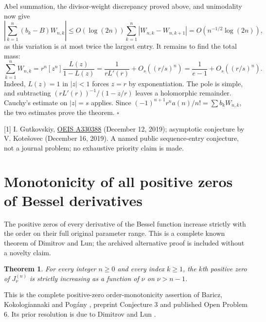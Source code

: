 \documentclass[11pt,a4paper]{article}
\numberwithin{equation}{section}
\newtheorem{theorem}{Theorem}[section]
\theoremstyle{definition}
\theoremstyle{remark}
\newenvironment{sectionabstract}{\par\smallskip\begingroup\small\noindent}{\par\endgroup\medskip}
\begin{document}
Abel summation, the divisor-weight discrepancy proved above, and unimodality now give
\[
 \left|\sum_{k=1}^n(b_k-B)W_{n,k}\right|
 \le O(\log(2n))\sum_{k=1}^n|W_{n,k}-W_{n,k+1}|
 =O(n^{-1/2}\log(2n)),
\]
as this variation is at most twice the largest entry. It remains to find the total mass:
\[
 \sum_{k=1}^n W_{n,k}
  =r^n[z^n]\frac{L(z)}{1-L(z)}
  =\frac{1}{rL'(r)}+O_s((r/s)^n)=\frac{1}{e-1}+O_s((r/s)^n).
\]
Indeed, $L(z)=1$ in $|z|<1$ forces $z=r$ by exponentiation. The pole is simple, and subtracting $(rL'(r))^{-1}/(1-z/r)$ leaves a holomorphic remainder. Cauchy's estimate on $|z|=s$ applies. Since $(-1)^{n+1}r^na(n)/n!=\sum b_kW_{n,k}$, the two estimates prove the theorem. $\square$

{\small\raggedright [1] I. Gutkovskiy, \href{https://oeis.org/A330388}{OEIS A330388} (December 12, 2019); asymptotic conjecture by V. Kote\v{s}ovec (December 16, 2019). A named public sequence-entry conjecture, not a journal problem; no exhaustive priority claim is made.\par}

\par\endgroup

\begingroup

\section{\texorpdfstring{Monotonicity of all positive zeros of Bessel derivatives}{Monotonicity of all positive zeros of Bessel derivatives}}\label{section:r38heisei}
\par\medskip

\begin{sectionabstract}
The positive zeros of every derivative of the Bessel function increase strictly with the order on their full original parameter range. This is a complete known theorem of Dimitrov and Lun; the archived alternative proof is included without a novelty claim.
\end{sectionabstract}
\begin{theorem}
For every integer $n\ge0$ and every index $k\ge1$, the $k$th positive zero of $J_\nu^{(n)}$ is strictly increasing as a function of $\nu$ on $\nu>n-1$.
\end{theorem}
This is the complete positive-zero order-monotonicity assertion of Baricz, Kokologiannaki and Pog\'any \cite{r38heisei:bkp}, preprint Conjecture 3 and published Open Problem 6. Its prior resolution is due to Dimitrov and Lun \cite{r38heisei:dl}.
\end{document}
